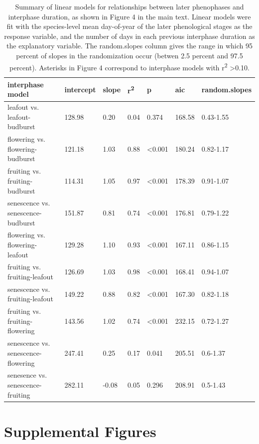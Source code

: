 \documentclass{article}
\begin{document}
\begin{table}[ht]
\centering
\caption{Summary of linear models for relationships between later phenophases and interphase duration, as shown in Figure 4 in the main text. Linear models were fit with the species-level mean day-of-year of the later phenological stages as the response variable, and the number of days in each previous interphase duration as the explanatory variable. The random.slopes column gives the range in which 95 percent of slopes in the randomization occur (betwen 2.5 percent and 97.5 percent). Asterisks in Figure 4 correspond to interphase models with r\textsuperscript{2} >0.10.} 
\label{table:interphase}
\begin{tabular}{|p{}|p{}|p{}|p{}|p{}|p{}|p{}|}
  \hline
interphase model & intercept & slope & r\textsuperscript{2} & p & aic & random.slopes \\ 
  \hline
leafout vs. leafout-budburst & 128.98 & 0.20 & 0.04 & 0.374 & 168.58 & 0.43-1.55 \\ 
  flowering vs. flowering-budburst & 121.18 & 1.03 & 0.88 & <0.001 & 180.24 & 0.82-1.17 \\ 
  fruiting vs. fruiting-budburst & 114.31 & 1.05 & 0.97 & <0.001 & 178.39 & 0.91-1.07 \\ 
  senescence vs. senescence-budburst & 151.87 & 0.81 & 0.74 & <0.001 & 176.81 & 0.79-1.22 \\ 
  flowering vs. flowering-leafout & 129.28 & 1.10 & 0.93 & <0.001 & 167.11 & 0.86-1.15 \\ 
  fruiting vs. fruiting-leafout & 126.69 & 1.03 & 0.98 & <0.001 & 168.41 & 0.94-1.07 \\ 
  senescence vs. fruiting-leafout & 149.22 & 0.88 & 0.82 & <0.001 & 167.30 & 0.82-1.18 \\ 
  fruiting vs. fruiting-flowering & 143.56 & 1.02 & 0.74 & <0.001 & 232.15 & 0.72-1.27 \\ 
  senescence vs. senescence-flowering & 247.41 & 0.25 & 0.17 & 0.041 & 205.51 & 0.6-1.37 \\ 
  senesence vs. senescence-fruiting & 282.11 & -0.08 & 0.05 & 0.296 & 208.91 & 0.5-1.43 \\ 
   \hline
\end{tabular}
\end{table}
\clearpage

\section* {Supplemental Figures}
\end{document}
